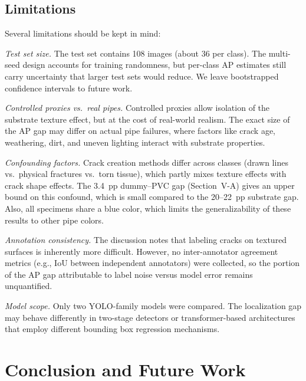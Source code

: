 \documentclass[conference]{IEEEtran}
\begin{document}
\subsection{Limitations}

Several limitations should be kept in mind:

\textit{Test set size.} The test set contains 108 images (about 36 per class). The multi-seed design accounts for training randomness, but per-class AP estimates still carry uncertainty that larger test sets would reduce. We leave bootstrapped confidence intervals to future work.

\textit{Controlled proxies vs.\ real pipes.} Controlled proxies allow isolation of the substrate texture effect, but at the cost of real-world realism. The exact size of the AP gap may differ on actual pipe failures, where factors like crack age, weathering, dirt, and uneven lighting interact with substrate properties.

\textit{Confounding factors.} Crack creation methods differ across classes (drawn lines vs.\ physical fractures vs.\ torn tissue), which partly mixes texture effects with crack shape effects. The 3.4~pp dummy--PVC gap (Section~V-A) gives an upper bound on this confound, which is small compared to the 20--22~pp substrate gap. Also, all specimens share a blue color, which limits the generalizability of these results to other pipe colors.

\textit{Annotation consistency.} The discussion notes that labeling cracks on textured surfaces is inherently more difficult. However, no inter-annotator agreement metrics (e.g., IoU between independent annotators) were collected, so the portion of the AP gap attributable to label noise versus model error remains unquantified.

\textit{Model scope.} Only two YOLO-family models were compared. The localization gap may behave differently in two-stage detectors or transformer-based architectures that employ different bounding box regression mechanisms.

\section{Conclusion and Future Work}
\end{document}
